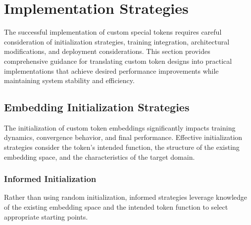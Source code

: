 
\section{Implementation Strategies}

The successful implementation of custom special tokens requires careful consideration of initialization strategies, training integration, architectural modifications, and deployment considerations. This section provides comprehensive guidance for translating custom token designs into practical implementations that achieve desired performance improvements while maintaining system stability and efficiency.

\subsection{Embedding Initialization Strategies}

The initialization of custom token embeddings significantly impacts training dynamics, convergence behavior, and final performance. Effective initialization strategies consider the token's intended function, the structure of the existing embedding space, and the characteristics of the target domain.

\subsubsection{Informed Initialization}

Rather than using random initialization, informed strategies leverage knowledge of the existing embedding space and the intended token function to select appropriate starting points.

